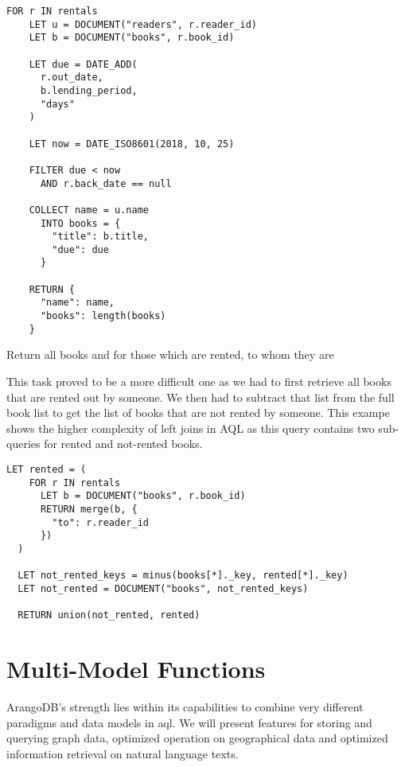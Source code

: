 \begin{lstlisting}[language=ArangoQL,label={lst:graph},caption={Return how many books each reader should have given back}]
  FOR r IN rentals
    LET u = DOCUMENT("readers", r.reader_id)
    LET b = DOCUMENT("books", r.book_id)

    LET due = DATE_ADD(
      r.out_date,
      b.lending_period,
      "days"
    )

    LET now = DATE_ISO8601(2018, 10, 25)
    
    FILTER due < now
      AND r.back_date == null
    
    COLLECT name = u.name
      INTO books = {
        "title": b.title,
        "due": due
      }

    RETURN {
      "name": name,
      "books": length(books)
    }
\end{lstlisting}

Return all books and for those which are rented, to whom they are

This task proved to be a more difficult one as we had to first retrieve all books that are rented out by someone. We then had to subtract that list from the full book list to get the list of books that are not rented by someone. This exampe shows the higher complexity of left joins in AQL as this query contains two sub-queries for rented and not-rented books.

\begin{lstlisting}[language=ArangoQL,label={lst:graph},caption={Return all books and for those which are rented, to whom they are}]
  LET rented = (
    FOR r IN rentals
      LET b = DOCUMENT("books", r.book_id)
      RETURN merge(b, {
        "to": r.reader_id
      })
  )

  LET not_rented_keys = minus(books[*]._key, rented[*]._key)
  LET not_rented = DOCUMENT("books", not_rented_keys)

  RETURN union(not_rented, rented)
\end{lstlisting}

\section{Multi-Model Functions}

ArangoDB's strength lies within its capabilities to combine very different paradigms and data models in \gls{aql}. We will present features for storing and querying graph data, optimized operation on geographical data and optimized information retrieval on natural language texts.

